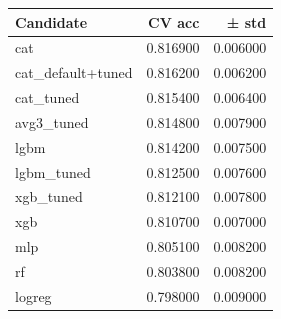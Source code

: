\begin{tabular}{lrr}
\toprule
Candidate & CV acc & ± std \\
\midrule
cat & 0.816900 & 0.006000 \\
cat_default+tuned & 0.816200 & 0.006200 \\
cat_tuned & 0.815400 & 0.006400 \\
avg3_tuned & 0.814800 & 0.007900 \\
lgbm & 0.814200 & 0.007500 \\
lgbm_tuned & 0.812500 & 0.007600 \\
xgb_tuned & 0.812100 & 0.007800 \\
xgb & 0.810700 & 0.007000 \\
mlp & 0.805100 & 0.008200 \\
rf & 0.803800 & 0.008200 \\
logreg & 0.798000 & 0.009000 \\
\bottomrule
\end{tabular}
